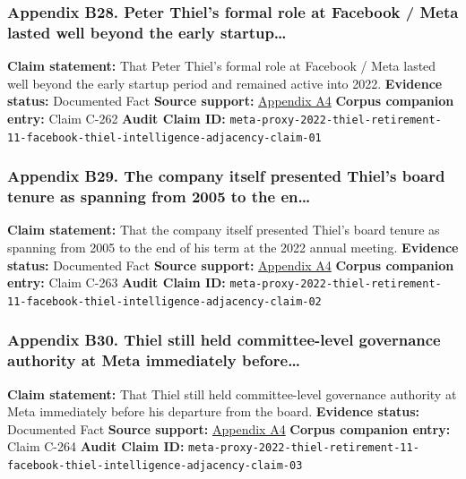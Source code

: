 \documentclass[
  american,
  11pt,
  letterpaper,
]{article}
\begin{document}
\subsubsection{Appendix B28. Peter Thiel's formal role at Facebook /
Meta lasted well beyond the early
startup\ldots{}}\label{ch-01-appendix-b28-peter-thiel-s-formal-role-at-facebook-meta-lasted-well-beyond-the-early-startup}

\textbf{Claim statement:} That Peter Thiel's formal role at Facebook /
Meta lasted well beyond the early startup period and remained active
into 2022. \textbf{Evidence status:} Documented Fact \textbf{Source
support:}
\hyperref[ch-01-appendix-a4-meta-platforms-inc-2022-definitive-proxy-statement]{Appendix
A4} \textbf{Corpus companion entry:} Claim C-262 \textbf{Audit Claim
ID:}
\texttt{meta-proxy-2022-thiel-retirement-11-facebook-thiel-intelligence-adjacency-claim-01}

\subsubsection{Appendix B29. The company itself presented Thiel's board
tenure as spanning from 2005 to the
en\ldots{}}\label{ch-01-appendix-b29-the-company-itself-presented-thiel-s-board-tenure-as-spanning-from-2005-to-the-en}

\textbf{Claim statement:} That the company itself presented Thiel's
board tenure as spanning from 2005 to the end of his term at the 2022
annual meeting. \textbf{Evidence status:} Documented Fact \textbf{Source
support:}
\hyperref[ch-01-appendix-a4-meta-platforms-inc-2022-definitive-proxy-statement]{Appendix
A4} \textbf{Corpus companion entry:} Claim C-263 \textbf{Audit Claim
ID:}
\texttt{meta-proxy-2022-thiel-retirement-11-facebook-thiel-intelligence-adjacency-claim-02}

\subsubsection{Appendix B30. Thiel still held committee-level governance
authority at Meta immediately
before\ldots{}}\label{ch-01-appendix-b30-thiel-still-held-committee-level-governance-authority-at-meta-immediately-before}

\textbf{Claim statement:} That Thiel still held committee-level
governance authority at Meta immediately before his departure from the
board. \textbf{Evidence status:} Documented Fact \textbf{Source
support:}
\hyperref[ch-01-appendix-a4-meta-platforms-inc-2022-definitive-proxy-statement]{Appendix
A4} \textbf{Corpus companion entry:} Claim C-264 \textbf{Audit Claim
ID:}
\texttt{meta-proxy-2022-thiel-retirement-11-facebook-thiel-intelligence-adjacency-claim-03}
\end{document}
